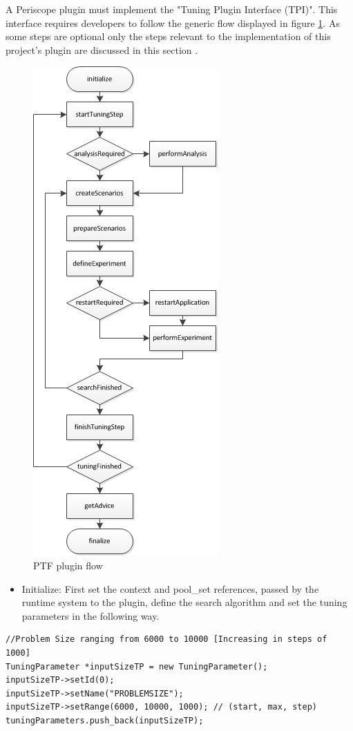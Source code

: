 \documentclass[10pt,twocolumn]{article}
\begin{document}
A Periscope plugin must implement the "Tuning Plugin Interface (TPI)". This interface requires developers to follow the generic flow displayed in figure \ref{fig:flow}. As some steps are optional only the steps relevant to the implementation of this project's plugin are discussed in this section \cite{flow}.

\begin{figure}[h]
	\centering
	\includegraphics[scale=0.5]{ptf_flow}
	\caption{PTF plugin flow \cite{flow}}
	\label{fig:flow}
\end{figure}

\begin{itemize}

\item Initialize: First set the context and pool\_set references, passed by the runtime system to the plugin, define the search algorithm and set the tuning parameters in the following way.
\end{itemize}
\begin{lstlisting}
//Problem Size ranging from 6000 to 10000 [Increasing in steps of 1000]
TuningParameter *inputSizeTP = new TuningParameter();
inputSizeTP->setId(0);
inputSizeTP->setName("PROBLEMSIZE");
inputSizeTP->setRange(6000, 10000, 1000); // (start, max, step)
tuningParameters.push_back(inputSizeTP);
\end{lstlisting}
\end{document}
